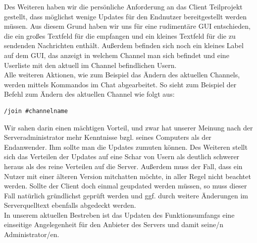 \documentclass[a4paper,12pt]{scrartcl}
\begin{document}
Des Weiteren haben wir die persönliche Anforderung an das Client Teilprojekt gestellt, dass möglichst wenige Updates für den Endnutzer bereitgestellt werden müssen. Aus diesem Grund haben wir uns für eine rudimentäre GUI entschieden, die ein großes Textfeld für die empfangen und ein kleines Textfeld für die zu sendenden Nachrichten enthält. Außerdem befinden sich noch ein kleines Label auf dem GUI, das anzeigt in welchem Channel man sich befindet und eine Userliste mit den aktuell im Channel befindlichen Usern.\\

Alle weiteren Aktionen, wie zum Beispiel das Ändern des aktuellen Channels, werden mittels Kommandos im Chat abgearbeitet. So sieht zum Beispiel der Befehl zum Ändern des aktuellen Channel wie folgt aus:
\begin{lstlisting}[frame=single,caption=Beispiel eines Befehls]
/join #channelname
\end{lstlisting}
Wir sahen darin einen mächtigen Vorteil, und zwar hat unserer Meinung nach der Serveradministrator mehr Kenntnisse bzgl. seines Computers als der Endanwender. Ihm sollte man die Updates zumuten können. Des Weiteren stellt sich das Verteilen der Updates auf eine Schar von Usern als deutlich schwerer heraus als des reine Verteilen auf die Server. Außerdem muss der Fall, dass ein Nutzer mit einer älteren Version mitchatten möchte, in aller Regel nicht beachtet werden. Sollte der Client doch einmal geupdated werden müssen, so muss dieser Fall natürlich gründlichst geprüft werden und ggf. durch weitere Änderungen im Serverquelltext ebenfalls abgedeckt werden.\\

In unserem aktuellen Bestreben ist das Updaten des Funktionsumfangs eine einseitige Angelegenheit für den Anbieter des Servers und damit seine/n Administrator/en.
\end{document}
